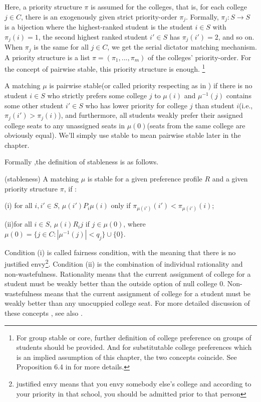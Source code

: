  Here, a priority structure $\pi$ is assumed for the colleges, that is, for each college $j \in C$, there is an exogenously given strict priority-order $\pi_j$. Formally, $\pi_j: S \rightarrow S$ is a bijection where the highest-ranked student  is the student $i\in S$ with $\pi_j(i)=1$, the second highest ranked student $i' \in S$ has $\pi_j(i')=2$, and so on. When $\pi_j$ is the same for all $j\in C$, we get the serial dictator matching mechanism. A priority structure is a list $ \pi = (\pi_1,...,\pi_m)$ of the colleges' priority-order. For the concept of pairwise stable, this priority structure is enough. \footnote{For group stable or core, further definition of college preference on groups of students should be provided. And for substitutable college preferences which is an implied assumption of this chapter, the two concepts coincide. See Proposition 6.4 in \parencite{Roth1990} for more details.}

 A matching $\mu$ is pairwise stable(or called priority respecting as in \parencite{Svensson2014}) if there is no student $i \in S$ who strictly prefers some college $j$ to $\mu(i)$ and $\mu^{-1}(j)$ contains some other student $i' \in S$ who has lower priority for college $j$ than student $i$(i.e., $\pi_j(i')>\pi_j(i)$), and furthermore, all students weakly prefer their assigned college seats to any unassigned seats in $\mu(0)$(seats from the same college are obviously equal). We'll simply use stable to mean pairwise stable later in the chapter.

 Formally ,the definition of stableness is as follows.

\begin{definition*}(stableness)
A matching $\mu$ is stable for a given preference profile $R$ and a given priority structure $\pi$, if :

(i) for all $i,i' \in S$, $\mu(i')P_i \mu(i)$ only if $\pi_{\mu(i')}(i') < \pi_{\mu(i')}(i)$;

(ii)for all $i \in S$, $\mu(i)R_i j$ if $j \in \mu(0)$, where $\mu(0) = \{j \in C : |\mu^{-1}(j)| < q_j\}\cup \{0\}$.

\end{definition*}

Condition (i) is called fairness condition, with the meaning that
there is no justified envy\footnote{justified envy means that you envy somebody
else's college and according to your priority in that school, you
should be admitted prior to that person}. Condition (ii) is the combination of
individual rationality and non-wastefulness. Rationality means that
the current assignment of college for a student must be weakly better than the outside
option of null college 0. Non-wastefulness means that the current
assignment of college for a student  must be weakly better than any
unocuppied college seat. For more detailed discussion of these concepts
, see also \parencite{Sonmez1999}. 


